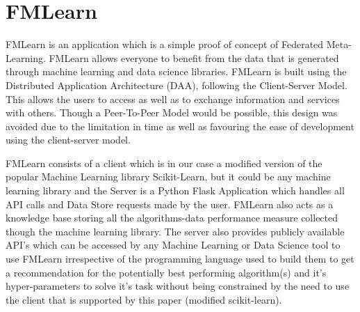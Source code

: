 \section{FMLearn}
\label{fmlearn}
FMLearn is an application which is a simple proof of concept of Federated Meta-Learning. FMLearn allows everyone to benefit from the data that is generated through machine learning and data science libraries. FMLearn is built using the Distributed Application Architecture (DAA), following the Client-Server Model. This allows the users to access as well as to exchange information and services with others. Though a Peer-To-Peer Model would be possible, this design was avoided due to the limitation in time as well as favouring the ease of development using the client-server model.

FMLearn consists of a client which is in our case a modified version of the popular Machine Learning library Scikit-Learn, but it could be any machine learning library and the Server is a Python Flask Application which handles all API calls and Data Store requests made by the user. FMLearn also acts as a knowledge base storing all the algorithms-data performance measure collected though the machine learning library. The server also provides publicly available API's which can be accessed by any Machine Learning or Data Science tool to use FMLearn irrespective of the programming language used to build them to get a recommendation for the potentially best performing algorithm(s) and it’s hyper-parameters to solve it’s task without being constrained by the need to use the client that is supported by this paper (modified scikit-learn).

